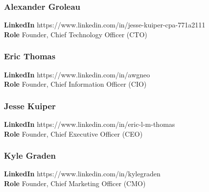 \documentclass[11pt]{article}
\begin{document}
\subsubsection{Alexander Groleau}
\begin{minipage}{\textwidth}
\textbf{LinkedIn} https://www.linkedin.com/in/jesse-kuiper-cpa-771a2111\\
\textbf{Role} Founder, Chief Technology Officer (CTO)\\
\end{minipage}

\subsubsection{Eric Thomas}
\begin{minipage}{\textwidth}
\textbf{LinkedIn} https://www.linkedin.com/in/awgneo\\
\textbf{Role} Founder, Chief Information Officer (CIO)\\
\end{minipage}

\subsubsection{Jesse Kuiper}
\begin{minipage}{\textwidth}
\textbf{LinkedIn} https://www.linkedin.com/in/eric-l-m-thomas\\
\textbf{Role} Founder, Chief Executive Officer (CEO)\\
\end{minipage}

\subsubsection{Kyle Graden}
\begin{minipage}{\textwidth}
\textbf{LinkedIn} https://www.linkedin.com/in/kylegraden\\
\textbf{Role} Founder, Chief Marketing Officer (CMO)\\
\end{minipage}

\pagebreak

\printbibliography

\vspace*{\fill}

\begin{flushright}

\pdfcreationdate
\end{flushright}
\end{document}
